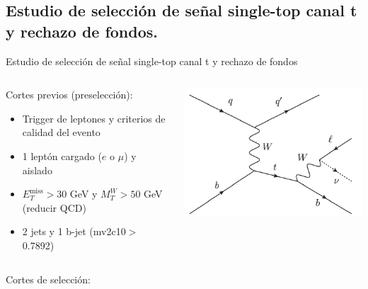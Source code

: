 \documentclass[10pt]{beamer}
\begin{document}
\subsection{Estudio de selección de señal single-top canal t y rechazo de fondos.}

\begin{frame}{Estudio de selección de señal single-top canal t y rechazo de fondos}
\begin{columns}
	\begin{column}{.65\textwidth}
		\color{blue}	Cortes previos (preselección):
	\begin{itemize}
		\item Trigger de leptones y criterios de calidad del evento
		\item 1 leptón cargado ($e$ o $\mu$) y aislado
		\item $E_T^{\text{miss}}>30 $ GeV y $M_T^{W}>50$ GeV  (reducir QCD)
		\item 2 jets y 1 b-jet (mv2c10$>$0.7892)
	\end{itemize}
\end{column}
	\begin{column}{.3\textwidth}
		\includegraphics[scale=0.25]{tchannel.png}
	\end{column}
\end{columns}
\begin{columns}
	\begin{column}{.65\textwidth}
		\color{blue}	Cortes de selección:
			

\end{column}
\end{columns}
\end{frame}
\end{document}
